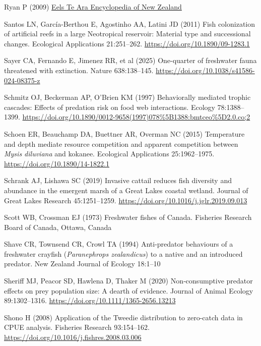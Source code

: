 \documentclass[
  12pt,
  a4paper,
]{scrbook}
\newlength{\cslhangindent}
\newenvironment{CSLReferences}[2] %
 {\begin{list}{}{%
  \setlength{\itemindent}{0pt}
  \setlength{\leftmargin}{0pt}
  \setlength{\parsep}{0pt}
  \ifodd #1
   \setlength{\leftmargin}{\cslhangindent}
   \setlength{\itemindent}{-1\cslhangindent}
  \fi
  \setlength{\itemsep}{#2\baselineskip}}}
 {\end{list}}
\begin{document}
\begin{CSLReferences}{1}{1}
Ryan P (2009) \href{https://teara.govt.nz/en/eels}{Eels \textbar{} {Te
Ara Encyclopedia of New Zealand}}

Santos LN, García-Berthou E, Agostinho AA, Latini JD (2011) Fish
colonization of artificial reefs in a large {Neotropical} reservoir:
Material type and successional changes. Ecological Applications
21:251--262. \url{https://doi.org/10.1890/09-1283.1}

Sayer CA, Fernando E, Jimenez RR, et al (2025) One-quarter of freshwater
fauna threatened with extinction. Nature 638:138--145.
\url{https://doi.org/10.1038/s41586-024-08375-z}

Schmitz OJ, Beckerman AP, O'Brien KM (1997) Behaviorally mediated
trophic cascades: Effects of predation risk on food web interactions.
Ecology 78:1388--1399.
\url{https://doi.org/10.1890/0012-9658(1997)078\%5B1388:bmtceo\%5D2.0.co;2}

Schoen ER, Beauchamp DA, Buettner AR, Overman NC (2015) Temperature and
depth mediate resource competition and apparent competition between
{\emph{Mysis diluviana}} and kokanee. Ecological Applications
25:1962--1975. \url{https://doi.org/10.1890/14-1822.1}

Schrank AJ, Lishawa SC (2019) Invasive cattail reduces fish diversity
and abundance in the emergent marsh of a {Great Lakes} coastal wetland.
Journal of Great Lakes Research 45:1251--1259.
\url{https://doi.org/10.1016/j.jglr.2019.09.013}

Scott WB, Crossman EJ (1973) Freshwater fishes of {Canada}. Fisheries
Research Board of Canada, Ottawa, Canada

Shave CR, Townsend CR, Crowl TA (1994) Anti-predator behaviours of a
freshwater crayfish ({\emph{Paranephrops zealandicus}}) to a native and
an introduced predator. New Zealand Journal of Ecology 18:1--10

Sheriff MJ, Peacor SD, Hawlena D, Thaker M (2020) Non‐consumptive
predator effects on prey population size: A dearth of evidence. Journal
of Animal Ecology 89:1302--1316.
\url{https://doi.org/10.1111/1365-2656.13213}

Shono H (2008) Application of the {Tweedie} distribution to zero-catch
data in {CPUE} analysis. Fisheries Research 93:154--162.
\url{https://doi.org/10.1016/j.fishres.2008.03.006}


\end{CSLReferences}
\end{document}
